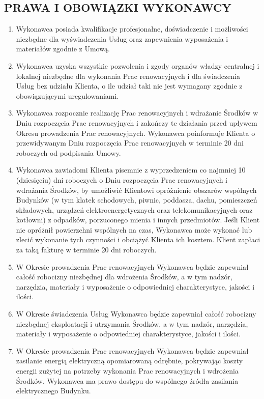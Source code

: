\begin{multicols}{2}
\subsection{PRAWA I OBOWIĄZKI WYKONAWCY}
\begin{enumerate}
	\item Wykonawca posiada kwalifikacje profesjonalne, doświadczenie i możliwości niezbędne dla wyświadczenia Usług oraz zapewnienia wyposażenia i materiałów zgodnie z Umową.
	\item Wykonawca uzyska wszystkie pozwolenia i zgody organów władzy centralnej i lokalnej niezbędne dla wykonania Prac renowacyjnych i dla świadczenia Usług bez udziału Klienta, o ile udział taki nie jest wymagany zgodnie z obowiązującymi uregulowaniami.
	\item Wykonawca rozpocznie realizację Prac renowacyjnych i wdrażanie Środków w Dniu rozpoczęcia Prac renowacyjnych i zakończy te działania przed upływem Okresu prowadzenia Prac renowacyjnych. Wykonawca poinformuje Klienta o przewidywanym Dniu rozpoczęcia Prac renowacyjnych w terminie 20 dni roboczych od podpisania Umowy.
	\item Wykonawca zawiadomi Klienta pisemnie z wyprzedzeniem co najmniej 10 (dziesięciu) dni roboczych o Dniu rozpoczęcia Prac renowacyjnych i wdrażania Środków, by umożliwić Klientowi opróżnienie obszarów wspólnych Budynków (w tym klatek schodowych, piwnic, poddasza, dachu, pomieszczeń składowych, urządzeń elektroenergetycznych oraz telekomunikacyjnych oraz kotłowni) z odpadków, porzuconego mienia i innych przedmiotów. Jeśli Klient nie opróżnił powierzchni wspólnych na czas, Wykonawca może wykonać lub zlecić wykonanie tych czynności i obciążyć Klienta ich kosztem. Klient zapłaci za taką fakturę w terminie 20 dni roboczych.
	\item W Okresie prowadzenia Prac renowacyjnych Wykonawca będzie zapewniał całość robocizny niezbędnej dla wdrożenia Środków, a w tym nadzór, narzędzia, materiały i wyposażenie o odpowiedniej charakterystyce, jakości i ilości.
	\item W Okresie świadczenia Usług Wykonawca będzie zapewniał całość robocizny niezbędnej eksploatacji i utrzymania Środków, a w tym nadzór, narzędzia, materiały i wyposażenie o odpowiedniej charakterystyce, jakości i ilości.
	\item W Okresie prowadzenia Prac renowacyjnych Wykonawca będzie zapewniał zasilanie energią elektryczną opomiarowaną odrębnie, pokrywając koszty energii zużytej na potrzeby wykonania Prac renowacyjnych i wdrożenia Środków. Wykonawca ma prawo dostępu do wspólnego źródła zasilania elektrycznego Budynku.

\end{enumerate}
\end{multicols}
